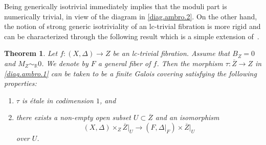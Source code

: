 \documentclass{amsart}[12pt,a4paper]
\newtheorem{theorem}{Theorem}[section]
\theoremstyle{definition}
\begin{document}
Being generically isotrivial immediately implies that the moduli part is numerically trivial, in view of the diagram in \eqref{diag.ambro.2}.
On the other hand, the notion of strong generic isotriviality of an lc-trivial fibration is more rigid and can be characterized through the following result which is a simple extension of~\cite[Theorem~4.7]{Amb05}.

\begin{theorem}
\label{ambro}
Let $f \colon (X,\Delta)\rightarrow Z$ be an lc-trivial fibration.
Assume that $B_{Z}=0$ and $M_{Z}\sim_\mathbb{R} 0$. 
We denote by $F$ a general fiber of $f$. 
Then the morphism \mbox{$\tau\colon \overline{Z} \rightarrow Z$} in \eqref{diag.ambro.1} can be taken to be a finite Galois covering 
satisfying the following properties: 
\begin{enumerate}
\item[(i)]
$\tau$ is \'etale in codimension $1$, and
\item[(ii)]
there exists a non-empty open subset $U\subset \overline{Z}$ and an isomorphism 
\[
(X,\Delta)\times_Z \overline{Z}\vert_U \rightarrow (F,\Delta\vert_F) \times \overline{Z}\vert_U
\] 
over $U$.
\end{enumerate}
\end{theorem}
\end{document}
